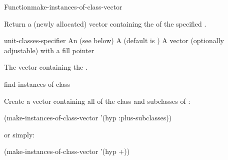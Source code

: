 \documentclass[10pt,twoside,english,pdftex]{article}
\begin{document}

\begin{functiondoc}{Function}{make-instances-of-class-vector}%
  {
      
    \returns{} }

%
%

\fnsyntax

\fnpurpose Return a (newly allocated) vector containing the
 of the specified .

\fnpackage {}

\fnmodule {}

\fnargs
\begin{args}{unit-classes-specifier}
 An 
(see below)
\arg[adjustable] A  (default is \nil)
\arg[vector] A vector (optionally adjustable) with a fill pointer
\end{args}

\fnreturns The vector containing the .

\fndsyntax
\W\supp\tabletop
\unitclassesspec
\subclassingspec

\begin{alsos}{find-instances-of-class}
\end{alsos}

\fnexample
Create a vector containing all  of the class 
and subclasses of :
%
\W\supp
\begin{example}
  (make-instances-of-class-vector '(hyp :plus-subclasses))
\end{example} 
%
or simply:
%
\W\supp\notpretop
\begin{example}
  (make-instances-of-class-vector '(hyp +))
\end{example} 

\end{functiondoc}

\end{document}
